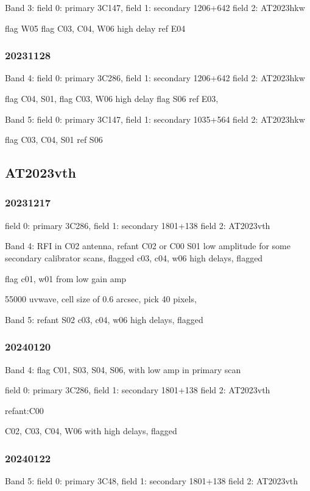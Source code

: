 \documentclass[twocolumn,twocolappendix]{aastex631}
\begin{document}
Band 3:
field 0: primary 3C147,
field 1: secondary 1206+642
field 2: AT2023hkw

flag W05
flag C03, C04, W06 high delay
ref E04

\subsubsection{20231128}

Band 4:
field 0: primary 3C286,
field 1: secondary 1206+642
field 2: AT2023hkw

flag C04, S01,
flag C03, W06 high delay
flag S06 
ref E03, 

Band 5:
field 0: primary 3C147,
field 1: secondary 1035+564
field 2: AT2023hkw

flag C03, C04, S01
ref S06

\subsection{AT2023vth}
\subsubsection{20231217}
field 0: primary 3C286,
field 1: secondary 1801+138
field 2: AT2023vth

Band 4:
RFI in C02 antenna, refant C02 or C00
S01 low amplitude for some secondary calibrator scans, flagged 
c03, c04, w06 high delays, flagged

flag c01, w01 from low gain amp

55000 uvwave, cell size of 0.6 arcsec, pick 40 pixels, 

Band 5:
refant S02
c03, c04, w06 high delays, flagged

\subsubsection{20240120}
Band 4:
flag C01, S03, S04, S06, with low amp in primary scan

field 0: primary 3C286,
field 1: secondary 1801+138
field 2: AT2023vth

refant:C00

C02, C03, C04, W06 with high delays, flagged

\subsubsection{20240122}

Band 5:
field 0: primary 3C48,
field 1: secondary 1801+138
field 2: AT2023vth
\end{document}
